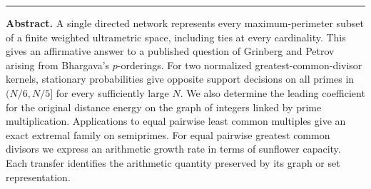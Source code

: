 \documentclass[11pt,a4paper]{article}
\begin{document}
\thispagestyle{plain}
\par
\vspace{9pt}\par
\vspace{4pt}\par
\vspace{9pt}\par
\vspace{9pt}\hrule\vspace{10pt}
\noindent\textbf{Abstract.}
A single directed network represents every maximum-perimeter subset of a finite weighted ultrametric space, including ties at every cardinality. This gives an affirmative answer to a published question of Grinberg and Petrov arising from Bhargava's $p$-orderings. For two normalized greatest-common-divisor kernels, stationary probabilities give opposite support decisions on all primes in $(N/6,N/5]$ for every sufficiently large $N$. We also determine the leading coefficient for the original distance energy on the graph of integers linked by prime multiplication. Applications to equal pairwise least common multiples give an exact extremal family on semiprimes. For equal pairwise greatest common divisors we express an arithmetic growth rate in terms of sunflower capacity. Each transfer identifies the arithmetic quantity preserved by its graph or set representation.
\end{document}
